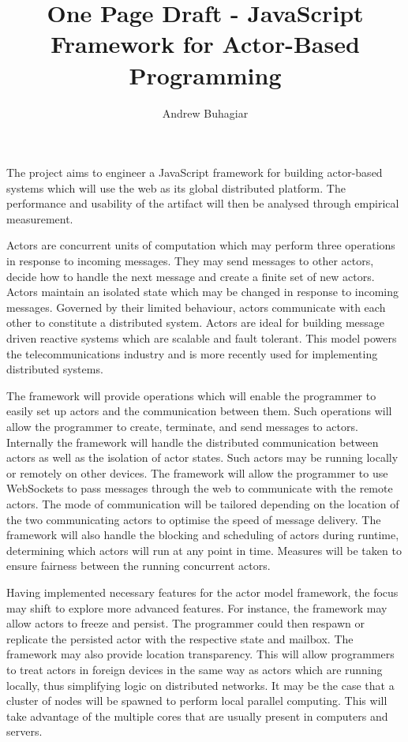 \documentclass[12pt]{report}
\author{Andrew Buhagiar}
\title{One Page Draft - JavaScript Framework for Actor-Based Programming}
\begin{document}
\maketitle
The project aims to engineer a JavaScript framework for building actor-based systems which will use the web as its global distributed platform. The performance and usability of the artifact will then be analysed through empirical measurement.

Actors are concurrent units of computation which may perform three operations in response to incoming messages. They may send messages to other actors, decide how to handle the next message and create a finite set of new actors. Actors maintain an isolated state which may be changed in response to incoming messages\cite{agha_1985}. Governed by their limited behaviour, actors communicate with each other to constitute a distributed system. Actors are ideal for building message driven reactive systems\cite{reactivemanifesto} which are scalable and fault tolerant. This model powers the telecommunications industry and is more recently used for implementing distributed systems.

The framework will provide operations which will enable the programmer to easily set up actors and the communication between them. Such operations will allow the programmer to create, terminate, and send messages to actors. Internally the framework will handle the distributed communication between actors as well as the isolation of actor states. Such actors may be running locally or remotely on other devices. The framework will allow the programmer to use WebSockets to pass messages through the web to communicate with the remote actors. The mode of communication will be tailored depending on the location of the two communicating actors to optimise the speed of message delivery. The framework will also handle the blocking and scheduling of actors during runtime, determining which actors will run at any point in time. Measures will be taken to ensure fairness between the running concurrent actors.

Having implemented necessary features for the actor model framework, the focus may shift to explore more advanced features. For instance, the framework may allow actors to freeze and persist. The programmer could then respawn or replicate the persisted actor with the respective state and mailbox. The framework may also provide location transparency. This will allow programmers to treat actors in foreign devices in the same way as actors which are running locally, thus simplifying logic on distributed networks. It may be the case that a cluster of nodes will be spawned to perform local parallel computing. This will take advantage of the multiple cores that are usually present in computers and servers.
\end{document}
